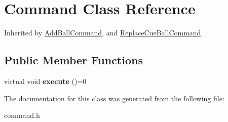 \hypertarget{class_command}{}\section{Command Class Reference}
\label{class_command}


Inherited by \mbox{\hyperlink{class_add_ball_command}{Add\+Ball\+Command}}, and \mbox{\hyperlink{class_replace_cue_ball_command}{Replace\+Cue\+Ball\+Command}}.

\subsection*{Public Member Functions}
\begin{DoxyCompactItemize}
\item 
\mbox{\label{class_command_a6fd7d9bd8df8bfc881e4d6c7cd1878b7}} 
virtual void {\bfseries execute} ()=0
\end{DoxyCompactItemize}


The documentation for this class was generated from the following file\+:\begin{DoxyCompactItemize}
\item 
command.\+h\end{DoxyCompactItemize}
